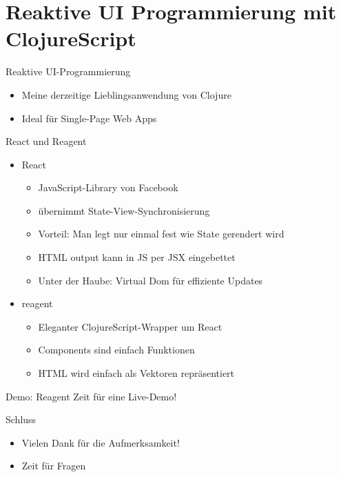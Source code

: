 \documentclass[presentation]{beamer}
\begin{document}
\section{Reaktive UI Programmierung mit ClojureScript}

\begin{frame}{Reaktive UI-Programmierung}
  \begin{itemize}
  \item Meine derzeitige Lieblingsanwendung von Clojure
  \item Ideal für Single-Page Web Apps
  \end{itemize}
\end{frame}

\begin{frame}{React und Reagent}
  \begin{itemize}
  \item React
    \begin{itemize}
    \item JavaScript-Library von Facebook
    \item übernimmt State-View-Synchronisierung
    \item Vorteil: Man legt nur einmal fest wie State gerendert wird
    \item HTML output kann in JS per JSX eingebettet
    \item Unter der Haube: Virtual Dom für effiziente Updates
    \end{itemize}
  \item reagent
    \begin{itemize}
    \item Eleganter ClojureScript-Wrapper um React
    \item Components sind einfach Funktionen
    \item HTML wird einfach als Vektoren repräsentiert
    \end{itemize}
  \end{itemize}
\end{frame}

\begin{frame}{Demo: Reagent}
  Zeit für eine Live-Demo!
\end{frame}

\begin{frame}{Schluss}
  \begin{itemize}
  \item Vielen Dank für die Aufmerksamkeit!
  \item Zeit für Fragen
  \end{itemize}
\end{frame}
\end{document}
